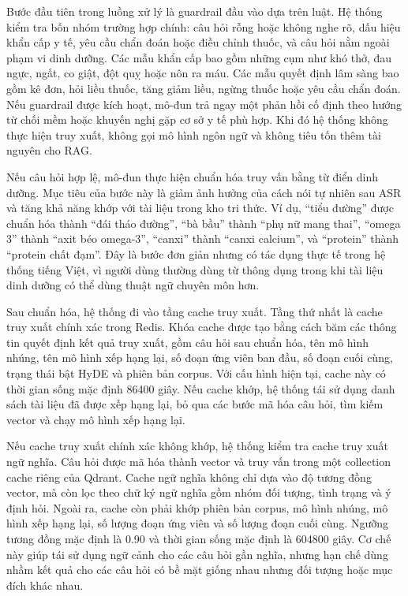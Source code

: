 \documentclass[a4paper,13pt,twoside]{report}
\begin{document}
Bước đầu tiên trong luồng xử lý là guardrail đầu vào dựa trên luật. Hệ thống kiểm tra bốn nhóm trường hợp chính: câu hỏi rỗng hoặc không nghe rõ, dấu hiệu khẩn cấp y tế, yêu cầu chẩn đoán hoặc điều chỉnh thuốc, và câu hỏi nằm ngoài phạm vi dinh dưỡng. Các mẫu khẩn cấp bao gồm những cụm như khó thở, đau ngực, ngất, co giật, đột quỵ hoặc nôn ra máu. Các mẫu quyết định lâm sàng bao gồm kê đơn, hỏi liều thuốc, tăng giảm liều, ngừng thuốc hoặc yêu cầu chẩn đoán. Nếu guardrail được kích hoạt, mô-đun trả ngay một phản hồi cố định theo hướng từ chối mềm hoặc khuyến nghị gặp cơ sở y tế phù hợp. Khi đó hệ thống không thực hiện truy xuất, không gọi mô hình ngôn ngữ và không tiêu tốn thêm tài nguyên cho RAG.

Nếu câu hỏi hợp lệ, mô-đun thực hiện chuẩn hóa truy vấn bằng từ điển dinh dưỡng. Mục tiêu của bước này là giảm ảnh hưởng của cách nói tự nhiên sau ASR và tăng khả năng khớp với tài liệu trong kho tri thức. Ví dụ, ``tiểu đường'' được chuẩn hóa thành ``đái tháo đường'', ``bà bầu'' thành ``phụ nữ mang thai'', ``omega 3'' thành ``axit béo omega-3'', ``canxi'' thành ``canxi calcium'', và ``protein'' thành ``protein chất đạm''. Đây là bước đơn giản nhưng có tác dụng thực tế trong hệ thống tiếng Việt, vì người dùng thường dùng từ thông dụng trong khi tài liệu dinh dưỡng có thể dùng thuật ngữ chuyên môn hơn.

Sau chuẩn hóa, hệ thống đi vào tầng cache truy xuất. Tầng thứ nhất là cache truy xuất chính xác trong Redis. Khóa cache được tạo bằng cách băm các thông tin quyết định kết quả truy xuất, gồm câu hỏi sau chuẩn hóa, tên mô hình nhúng, tên mô hình xếp hạng lại, số đoạn ứng viên ban đầu, số đoạn cuối cùng, trạng thái bật HyDE và phiên bản corpus. Với cấu hình hiện tại, cache này có thời gian sống mặc định 86400 giây. Nếu cache khớp, hệ thống tái sử dụng danh sách tài liệu đã được xếp hạng lại, bỏ qua các bước mã hóa câu hỏi, tìm kiếm vector và chạy mô hình xếp hạng lại.

Nếu cache truy xuất chính xác không khớp, hệ thống kiểm tra cache truy xuất ngữ nghĩa. Câu hỏi được mã hóa thành vector và truy vấn trong một collection cache riêng của Qdrant. Cache ngữ nghĩa không chỉ dựa vào độ tương đồng vector, mà còn lọc theo chữ ký ngữ nghĩa gồm nhóm đối tượng, tình trạng và ý định hỏi. Ngoài ra, cache còn phải khớp phiên bản corpus, mô hình nhúng, mô hình xếp hạng lại, số lượng đoạn ứng viên và số lượng đoạn cuối cùng. Ngưỡng tương đồng mặc định là 0.90 và thời gian sống mặc định là 604800 giây. Cơ chế này giúp tái sử dụng ngữ cảnh cho các câu hỏi gần nghĩa, nhưng hạn chế dùng nhầm kết quả cho các câu hỏi có bề mặt giống nhau nhưng đối tượng hoặc mục đích khác nhau.
\end{document}
